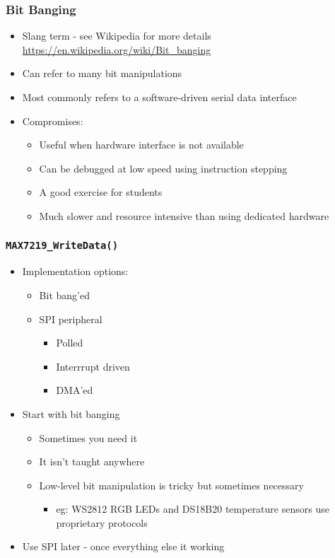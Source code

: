 \documentclass[14pt]{beamer}
\begin{document}
\begin{frame}[fragile]
\frametitle{Bit Banging}
\begin{itemize}
\item Slang term - see Wikipedia for more details\\
\small
\url{https://en.wikipedia.org/wiki/Bit_banging}
\normalsize
\item Can refer to many bit manipulations
\item Most commonly refers to a software-driven serial data interface
\item Compromises:
	\begin{itemize}
		\item Useful when hardware interface is not available
		\item Can be debugged at low speed using instruction stepping
		\item A good exercise for students
		\item Much slower and resource intensive than using dedicated hardware
	\end{itemize}
\end{itemize}
\end{frame}

\begin{frame}[fragile]
\frametitle{\texttt{MAX7219\_WriteData()}}
\begin{itemize}
\item Implementation options:
	\begin{itemize}
		\item Bit bang'ed
		\item SPI peripheral
			\begin{itemize}
				\item Polled
				\item Interrrupt driven
				\item DMA'ed
			\end{itemize}
	\end{itemize}
\pause
\item Start with bit banging
	\begin{itemize}
		\item Sometimes you need it
		\item It isn't taught anywhere
		\item Low-level bit manipulation is tricky but sometimes necessary
			\begin{itemize}
				\item eg: WS2812 RGB LEDs and DS18B20 temperature sensors use proprietary protocols
			\end{itemize}
	\end{itemize}
\item Use SPI later - once everything else it working
\end{itemize}
\end{frame}
\end{document}
